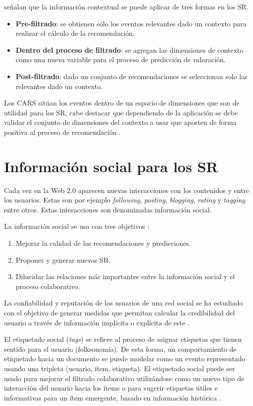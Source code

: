\cite{Adomavicius:2011} señalan que la información contextual se puede aplicar de tres formas en los SR.
\begin{itemize}
	\item \textbf{Pre-filtrado}: se obtienen sólo los eventos relevantes dado un contexto para realizar el cálculo de la recomendación.
	\item \textbf{Dentro del proceso de filtrado}: se agregan las dimensiones de contexto como una nueva variable para el proceso de predicción de valoración.
	\item\textbf{ Post-filtrado}: dado un conjunto de recomendaciones se seleccionan solo las relevantes dado un contexto.
\end{itemize}

Los CARS sitúan los eventos dentro de un espacio de dimensiones que son de utilidad para los SR, cabe destacar que dependiendo de la aplicación se debe validar el conjunto de dimensiones del contexto a usar que aporten de forma positiva al proceso de recomendación \citep{Zhang:2010}.


\section{Informaci\'on social para los SR}
\label{marco:informacionsocial}

Cada vez en la Web 2.0 aparecen nuevas interacciones con los contenidos y entre los usuarios. Estas son por ejemplo \textit{following}, \textit{posting}, \textit{blogging}, \textit{rating} y \textit{tagging} entre otros. Estas interacciones son denominadas información social.

La información social se usa con tres objetivos \citep{Bobadilla:2013}:

\begin{enumerate}
	\item Mejorar la calidad de las recomendaciones y predicciones.
	\item Proponer y generar nuevos SR.
	\item Dilucidar las relaciones más importantes entre la información social y el proceso colaborativo.
\end{enumerate}

La confiabilidad y reputación de los usuarios de una red social se ha estudiado con el objetivo de generar medidas que permitan calcular la credibilidad del usuario a través de información implícita o explícita de este \citep{Victor:2011}.

El etiquetado social (\textit{tags}) se refiere al proceso de asignar etiquetas que tienen sentido para el usuario (folksonomía). De esta forma, un comportamiento de etiquetado hacia un documento se puede modelar como un evento representado usando una tripleta (usuario, ítem, etiqueta).  El etiquetado social puede ser usado para mejorar el filtrado colaborativo  utilizándose como un nuevo tipo de interacción del usuario hacia los ítems \citep{Bobadilla:2013} o para sugerir etiquetas útiles e informativas para un ítem emergente, basado en información histórica \citep{Song:2011}. 

